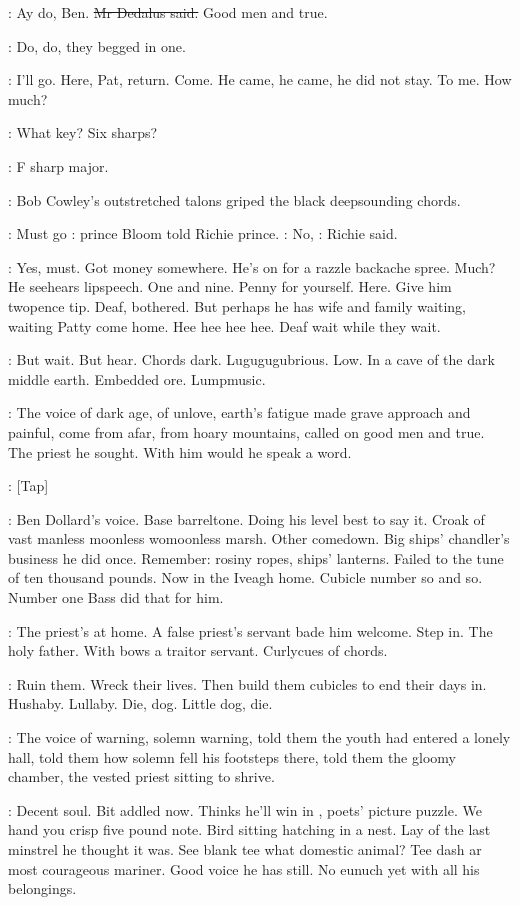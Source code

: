 \simon:
Ay do, Ben.
\sout{Mr Dedalus said.}
Good men and true.

:
Do, do, they begged in one.

\BloomInt:
I'll go. Here, Pat, return. Come.
He came, he came, he did not stay.
To me. How much?

\cowley:
What key? Six sharps?

\dollard:
F sharp major.

:
Bob Cowley's outstretched talons griped the
black deepsounding chords.

\BloomInt:
Must go
:
prince Bloom told Richie prince.
\goulding:
No,
:
Richie said.

\BloomInt:
Yes, must.
Got money somewhere. He's on for a razzle backache spree. Much? He
seehears lipspeech. One and nine. Penny for yourself. Here. Give him
twopence tip. Deaf, bothered. But perhaps he has wife and family waiting,
waiting Patty come home. Hee hee hee hee. Deaf wait while they wait.

\BloomInt:
But wait. But hear. Chords dark. Lugugugubrious. Low. In a cave of
the dark middle earth. Embedded ore. Lumpmusic.

:
The voice of dark age, of unlove, earth's fatigue made grave approach
and painful, come from afar, from hoary mountains, called on good men
and true. The priest he sought. With him would he speak a word.

\stripling:
[Tap]

\BloomInt:
Ben Dollard's voice. Base barreltone. Doing his level best to say it.
Croak of vast manless moonless womoonless marsh. Other comedown. Big
ships' chandler's business he did once. Remember: rosiny ropes, ships'
lanterns. Failed to the tune of ten thousand pounds. Now in the Iveagh
home. Cubicle number so and so. Number one Bass did that for him.

:
The priest's at home. A false priest's servant bade him welcome. Step
in. The holy father. With bows a traitor servant. Curlycues of chords.

\BloomInt:
Ruin them. Wreck their lives. Then build them cubicles to end their
days in. Hushaby. Lullaby. Die, dog. Little dog, die.

:
The voice of warning,
solemn warning, told them the youth had
entered a lonely hall, told them how solemn fell his footsteps there, told
them the gloomy chamber, the vested priest sitting to shrive.

\BloomInt:
Decent soul. Bit addled now. Thinks he'll win in
, poets' picture puzzle.
We hand you crisp five pound note. Bird sitting hatching
in a nest. Lay of the last minstrel he thought it was. See blank tee what
domestic animal? Tee dash ar most courageous mariner. Good voice he has
still. No eunuch yet with all his belongings.

